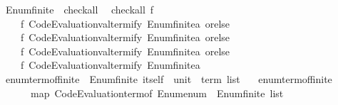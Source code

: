 \begin{isabellebody}
%
\endisatagproof
{\isafoldproof}%
%
\isadelimproof
%
\endisadelimproof
\isanewline
\isanewline
{}\isamarkupfalse%
\isanewline
\isanewline
{}\isamarkupfalse%
\ Enum{\isachardot}{\kern0pt}finite{\isacharunderscore}{\kern0pt}{}\ {\isacharcolon}{\kern0pt}{\isacharcolon}{\kern0pt}\ check{\isacharunderscore}{\kern0pt}all\isanewline
{}\isanewline
\isanewline
{}\isamarkupfalse%
\isanewline
\ \ {\isachardoublequoteopen}check{\isacharunderscore}{\kern0pt}all\ f\ {\isacharequal}{\kern0pt}\isanewline
\ \ \ \ f\ {\isacharparenleft}{\kern0pt}Code{\isacharunderscore}{\kern0pt}Evaluation{\isachardot}{\kern0pt}valtermify\ Enum{\isachardot}{\kern0pt}finite{\isacharunderscore}{\kern0pt}{}{\isachardot}{\kern0pt}a\ orelse\isanewline
\ \ \ \ f\ {\isacharparenleft}{\kern0pt}Code{\isacharunderscore}{\kern0pt}Evaluation{\isachardot}{\kern0pt}valtermify\ Enum{\isachardot}{\kern0pt}finite{\isacharunderscore}{\kern0pt}{}{\isachardot}{\kern0pt}a\ orelse\isanewline
\ \ \ \ f\ {\isacharparenleft}{\kern0pt}Code{\isacharunderscore}{\kern0pt}Evaluation{\isachardot}{\kern0pt}valtermify\ Enum{\isachardot}{\kern0pt}finite{\isacharunderscore}{\kern0pt}{}{\isachardot}{\kern0pt}a\ orelse\isanewline
\ \ \ \ f\ {\isacharparenleft}{\kern0pt}Code{\isacharunderscore}{\kern0pt}Evaluation{\isachardot}{\kern0pt}valtermify\ Enum{\isachardot}{\kern0pt}finite{\isacharunderscore}{\kern0pt}{}{\isachardot}{\kern0pt}a\isanewline
\isanewline
{}\isamarkupfalse%
\ enum{\isacharunderscore}{\kern0pt}term{\isacharunderscore}{\kern0pt}of{\isacharunderscore}{\kern0pt}finite{\isacharunderscore}{\kern0pt}{}\ {\isacharcolon}{\kern0pt}{\isacharcolon}{\kern0pt}\ {\isachardoublequoteopen}Enum{\isachardot}{\kern0pt}finite{\isacharunderscore}{\kern0pt}{}\ itself\ {\isasymRightarrow}\ unit\ {\isasymRightarrow}\ term\ list{\isachardoublequoteclose}\isanewline
\ \ \ {\isachardoublequoteopen}enum{\isacharunderscore}{\kern0pt}term{\isacharunderscore}{\kern0pt}of{\isacharunderscore}{\kern0pt}finite{\isacharunderscore}{\kern0pt}{}\ {\isacharequal}{\kern0pt}\isanewline
\ \ \ \ {\isacharparenleft}{\kern0pt}{\isasymlambda}{\isacharunderscore}{\kern0pt}\ {\isacharunderscore}{\kern0pt}{\isachardot}{\kern0pt}\ map\ Code{\isacharunderscore}{\kern0pt}Evaluation{\isachardot}{\kern0pt}term{\isacharunderscore}{\kern0pt}of\ {\isacharparenleft}{\kern0pt}Enum{\isachardot}{\kern0pt}enum\ {\isacharcolon}{\kern0pt}{\isacharcolon}{\kern0pt}\ Enum{\isachardot}{\kern0pt}finite{\isacharunderscore}{\kern0pt}{}\ list{\isacharparenright}{\kern0pt}{\isacharparenright}{\kern0pt}{\isachardoublequoteclose}\isanewline

\end{isabellebody}
